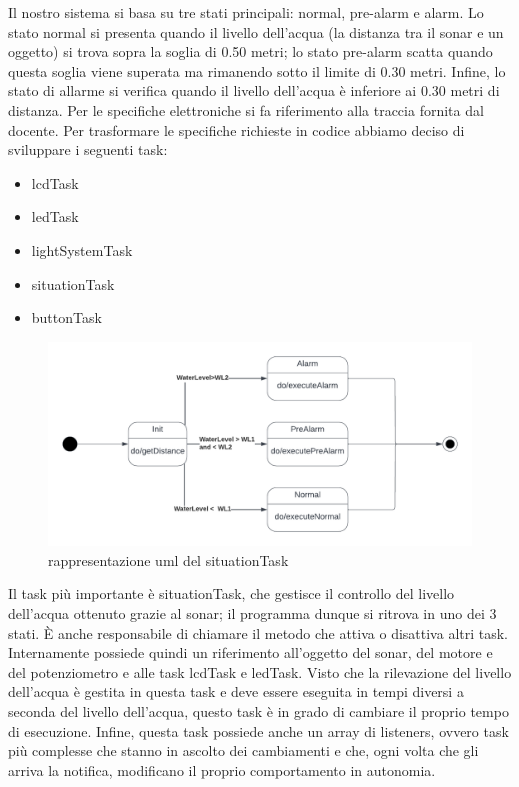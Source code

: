 \documentclass[a4paper,12pt]{report}
\begin{document}
Il nostro sistema si basa su tre stati principali: normal, pre-alarm e alarm. Lo stato normal si presenta quando il livello dell'acqua (la distanza tra il sonar e un oggetto) si trova sopra la soglia di 0.50 metri; lo stato pre-alarm scatta quando questa soglia viene superata ma rimanendo sotto il limite di 0.30 metri. Infine, lo stato di allarme si verifica quando il livello dell'acqua è inferiore ai 0.30 metri di distanza. 
Per le specifiche elettroniche si fa riferimento alla traccia fornita dal docente.
Per trasformare le specifiche richieste in codice abbiamo deciso di sviluppare i seguenti task:
\begin{itemize}
    \item lcdTask
    \item ledTask
    \item lightSystemTask
    \item situationTask
    \item buttonTask
\end{itemize}
\begin{figure}[H]
    \centering
    \includegraphics[width=13cm]{Blank diagram.png}
    \caption{rappresentazione uml del situationTask}
\end{figure}
\par
Il task più importante è situationTask, che gestisce il controllo del livello dell'acqua ottenuto grazie al sonar; il programma dunque si ritrova in uno dei 3 stati. È anche responsabile di chiamare il metodo che attiva o disattiva altri task. Internamente possiede quindi un riferimento all’oggetto del sonar, del motore e del potenziometro e alle task lcdTask e ledTask. Visto che la rilevazione del livello dell’acqua è gestita in questa task e deve essere eseguita in tempi diversi a seconda del livello dell’acqua, questo task è in grado di cambiare il proprio tempo di esecuzione. Infine, questa task possiede anche un array di listeners, ovvero task più complesse che stanno in ascolto dei cambiamenti e che, ogni volta che gli arriva la notifica, modificano il proprio comportamento in autonomia.
\end{document}
